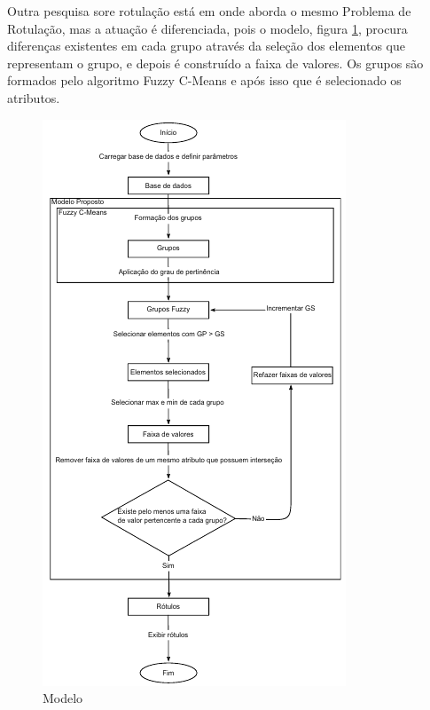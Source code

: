 Outra pesquisa sore rotulação está em \cite{Filho2015} onde aborda o mesmo Problema de Rotulação, mas a atuação é diferenciada, pois o modelo, figura \ref{fig:modeloFilhoVilmar}, procura diferenças existentes em cada grupo através da seleção dos elementos que representam o grupo, e depois é construído a faixa de valores. Os grupos são formados pelo algoritmo Fuzzy C-Means e após isso que é selecionado os atributos. 
\begin{figure}[!h]
        \centering
        \includegraphics[scale=0.8]{figs/modeloRotFuzzy.png}
        \caption{Modelo \cite{Filho2015}} \label{fig:modeloFilhoVilmar}
\end{figure}






